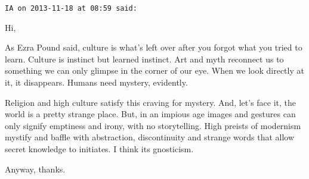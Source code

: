 \begin{footnotesize}
\begin{sffamily}
\texttt{IA on 2013-11-18 at 08:59 said:}

Hi,

As Ezra Pound said, culture is what's left over after you forgot what you tried to learn. Culture is instinct but learned instinct. Art and myth reconnect us to something we can only glimpse in the corner of our eye. When we look directly at it, it disappears. Humans need mystery, evidently.

Religion and high culture satisfy this craving for mystery. And, let's face it, the world is a pretty strange place. But, in an impious age images and gestures can only signify emptiness and irony, with no storytelling. High preists of modernism mystify and baffle with abstraction, discontinuity and strange words that allow secret knowledge to initiates. I think its gnosticism.

Anyway, thanks.


\hfill

\end{sffamily}
\end{footnotesize}


